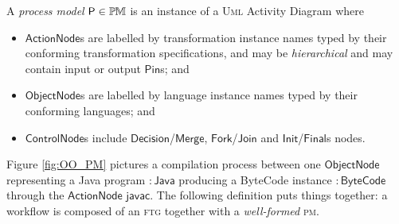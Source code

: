 
\begin{Definition}
A \emph{process model} $\mathsf{P}\in\mathbb{P}\mskip-1mu\mathbb{M}$ is an instance of a \textsc{Uml}
Activity Diagram where
\begin{itemize}
   \item $\mathsf{ActionNode}$s are labelled by transformation instance names 
typed by their conforming transformation specifications, and may be 
\emph{hierarchical} and may contain input or output $\mathsf{Pin}$s; and 
   \item $\mathsf{ObjectNode}$s are labelled by language instance names typed 
by their conforming languages; and 
   \item $\mathsf{ControlNode}$s include 
$\mathsf{Decision}$/$\mathsf{Merge}$, $\mathsf{Fork}$/$\mathsf{Join}$ and 
$\mathsf{Init}$/$\mathsf{Final}$s nodes.   
\end{itemize}
\end{Definition}
Figure \ref{fig:OO_PM} pictures a compilation process between one 
$\mathsf{ObjectNode}$ representing a Java program $\mathsf{:Java}$ producing a 
ByteCode instance $\mathsf{:ByteCode}$ through the  $\mathsf{ActionNode}$ 
$\mathsf{javac}$.
The following definition puts things together: a workflow is composed of 
an \textsc{ftg} together with a \emph{well-formed} \textsc{pm}. 




